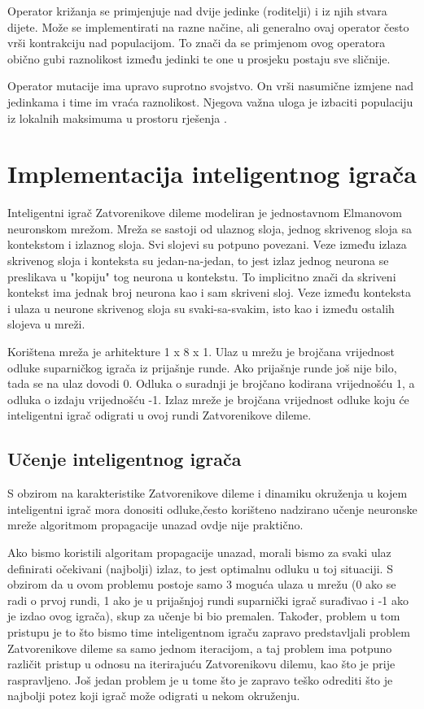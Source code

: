 \documentclass[zavrsnirad]{fer}
\begin{document}
		Operator križanja se primjenjuje nad dvije jedinke (roditelji) i iz njih stvara dijete. Može se implementirati na razne načine, ali generalno ovaj operator često vrši kontrakciju nad populacijom. To znači da se primjenom ovog operatora obično gubi raznolikost između jedinki te one u prosjeku postaju sve sličnije. \cite{skriptaEvolucijskoRacunarstvo}
		
		Operator mutacije ima upravo suprotno svojstvo. On vrši nasumične izmjene nad jedinkama i time im vraća raznolikost. Njegova važna uloga je izbaciti populaciju iz lokalnih maksimuma u prostoru rješenja \cite{skriptaEvolucijskoRacunarstvo}.
	
\chapter{Implementacija inteligentnog igrača}

	Inteligentni igrač Zatvorenikove dileme modeliran je jednostavnom Elmanovom neuronskom mrežom. Mreža se sastoji od ulaznog sloja, jednog skrivenog sloja sa kontekstom i izlaznog sloja. Svi slojevi su potpuno povezani. Veze između izlaza skrivenog sloja i konteksta su jedan-na-jedan, to jest izlaz jednog neurona se preslikava u "kopiju" tog neurona u kontekstu. To implicitno znači da skriveni kontekst ima jednak broj neurona kao i sam skriveni sloj. Veze između konteksta i ulaza u neurone skrivenog sloja su svaki-sa-svakim, isto kao i između ostalih slojeva u mreži.
	
	Korištena mreža je arhitekture 1 x 8 x 1. Ulaz u mrežu je brojčana vrijednost odluke suparničkog igrača iz prijašnje runde. Ako prijašnje runde još nije bilo, tada se na ulaz dovodi 0. Odluka o suradnji je brojčano kodirana vrijednošću 1, a odluka o izdaju vrijednošću -1. Izlaz mreže je brojčana vrijednost odluke koju će inteligentni igrač odigrati u ovoj rundi Zatvorenikove dileme.

	\section{Učenje inteligentnog igrača}
	
	S obzirom na karakteristike Zatvorenikove dileme i dinamiku okruženja u kojem inteligentni igrač mora donositi odluke,često korišteno nadzirano učenje neuronske mreže algoritmom propagacije unazad ovdje nije praktično.
	
	Ako bismo koristili algoritam propagacije unazad, morali bismo za svaki ulaz definirati očekivani (najbolji) izlaz, to jest optimalnu odluku u toj situaciji. S obzirom da u ovom problemu postoje samo 3 moguća ulaza u mrežu (0 ako se radi o prvoj rundi, 1 ako je u prijašnjoj rundi suparnički igrač surađivao i -1 ako je izdao ovog igrača), skup za učenje bi bio premalen. Također, problem u tom pristupu je to što bismo time inteligentnom igraču zapravo predstavljali problem Zatvorenikove dileme sa samo jednom iteracijom, a taj problem ima potpuno različit pristup u odnosu na iterirajuću Zatvorenikovu dilemu, kao što je prije raspravljeno. Još jedan problem je u tome što je zapravo teško odrediti što je najbolji potez koji igrač može odigrati u nekom okruženju. 
	
\end{document}
